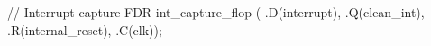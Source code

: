 \begin{vcode}
// Interrupt capture
FDR int_capture_flop (
    .D(interrupt),
    .Q(clean_int),
    .R(internal_reset),
    .C(clk));
\end{vcode}

